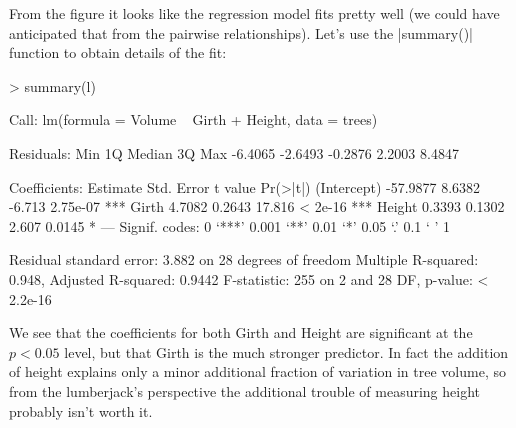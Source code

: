 From the figure it looks like the regression model fits pretty well (we could have anticipated that from the pairwise relationships).  Let's use the |summary()| function to obtain details of the fit:
\begin{R}
> summary(l)

Call:
lm(formula = Volume ~ Girth + Height, data = trees)

Residuals:
    Min      1Q  Median      3Q     Max
-6.4065 -2.6493 -0.2876  2.2003  8.4847

Coefficients:
            Estimate Std. Error t value Pr(>|t|)
(Intercept) -57.9877     8.6382  -6.713 2.75e-07 ***
Girth         4.7082     0.2643  17.816  < 2e-16 ***
Height        0.3393     0.1302   2.607   0.0145 *
---
Signif. codes:  0 ‘***’ 0.001 ‘**’ 0.01 ‘*’ 0.05 ‘.’ 0.1 ‘ ’ 1

Residual standard error: 3.882 on 28 degrees of freedom
Multiple R-squared: 0.948,  Adjusted R-squared: 0.9442
F-statistic:   255 on 2 and 28 DF,  p-value: < 2.2e-16
\end{R}
%
We see that the coefficients for both Girth and Height are significant at the $p<0.05$ level, but that Girth is the much stronger predictor. In fact the addition of height explains only a minor additional fraction of variation in tree volume, so from the lumberjack's perspective the additional trouble of measuring height probably isn't worth it.

